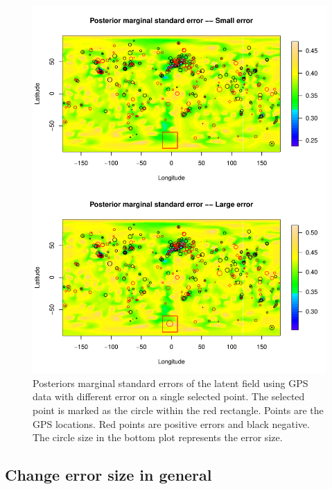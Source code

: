 \documentclass[a4paper,12pt]{article}
\begin{document}
 \begin{figure}[htbp]
 \begin{center}
 \includegraphics[scale=0.8]{fig/PointErr_GIAfield.pdf}
 \end{center}
 \caption[Posterior marginal standard errors of the latent field]{Posteriors marginal standard errors of the latent field using GPS data with different error on a single selected point. The selected point is marked as the circle within the red rectangle. Points are the GPS locations. Red points are positive errors and black negative. The circle size in the bottom plot represents the error size.}
 \label{fig:6}
 \end{figure}
 
 \subsection{Change error size in general}
\end{document}
